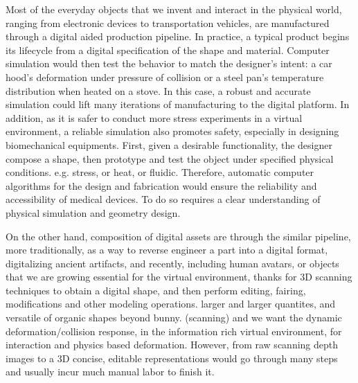 % 

Most of the everyday objects that we invent and interact in the physical world, ranging from electronic devices to transportation vehicles, are manufactured through a digital aided production pipeline.
In practice, a typical product begins its lifecycle from a digital specification of the shape and material. 
Computer simulation would then test the behavior to match the designer's intent: a car hood's deformation under pressure of collision or a steel pan's temperature distribution when heated on a stove. In this case, a robust and accurate simulation could lift many iterations of manufacturing to the digital platform. In addition, as it is safer to conduct more stress experiments in a virtual environment, a reliable simulation also promotes safety, especially in designing biomechanical equipments. 
First, given a desirable functionality, the designer compose a shape, then prototype and test the object under specified physical conditions. e.g. stress, or heat, or fluidic. 
Therefore, automatic computer algorithms for the design and fabrication would ensure the reliability and accessibility of medical devices. To do so requires a clear understanding of physical simulation and geometry design.

On the other hand, composition of digital assets are through the similar pipeline, more traditionally, as a way to reverse engineer a part into a digital format, digitalizing ancient artifacts, and recently, including human avatars, or objects that we are growing essential for the virtual environment, thanks for 3D scanning techniques to obtain a digital shape, and then perform editing, fairing, modifications and other modeling operations. larger and larger quantites, and versatile of organic shapes beyond bunny. (scanning) and we want the dynamic deformation/collision response, in the information rich virtual environment, for interaction and physics based deformation. 
However, from raw scanning depth images to a 3D concise, editable representations would go through many steps and usually incur much manual labor to finish it.


